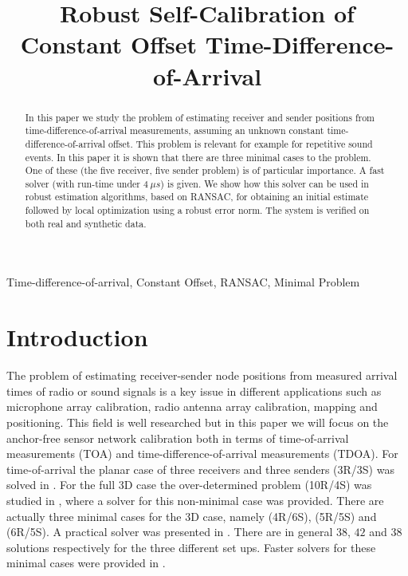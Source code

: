 \documentclass{article}
\title{Robust Self-Calibration of Constant Offset Time-Difference-of-Arrival}
\begin{document}
%
\maketitle
%
\begin{abstract}
In this paper we study the problem of estimating receiver and sender positions  from time-difference-of-arrival measurements, assuming an unknown constant time-difference-of-arrival offset. This problem is relevant for example for repetitive sound events. In this paper it is shown that there are three minimal cases to the problem. One of these (the five receiver, five sender problem) is of particular importance. A fast solver (with run-time under $4~ \mu s$) is given. We show how this solver can be used in robust estimation algorithms, based on RANSAC, for obtaining an initial estimate followed by local optimization using a robust error norm. The system is verified on both real and synthetic data. 
\end{abstract}
%
\begin{keywords}
Time-difference-of-arrival, Constant Offset, RANSAC, Minimal Problem
\end{keywords}
%
\vspace{-5pt}
\section{Introduction}
\label{sec:intro}
\vspace{-5pt}

The problem of estimating receiver-sender node positions from measured arrival times of radio or sound signals is a key issue in different applications such as microphone array calibration, radio antenna array calibration, mapping and positioning. This field is well researched but in this paper we will focus on the anchor-free sensor network calibration both in terms of time-of-arrival measurements (TOA) and time-difference-of-arrival measurements (TDOA). 
For time-of-arrival the planar case of three receivers and three senders (3R/3S) was solved in \cite{stewenius-phd-2005}.
For the full 3D case the over-determined problem (10R/4S) was studied in \cite{pollefeys-nister-icassp-08}, where a solver for this non-minimal case was provided.   
There are actually three minimal cases for the 3D case, namely (4R/6S), (5R/5S) and (6R/5S). A practical solver was presented in
\cite{kuang-burgess-etal-icassp-13}. There are in general $38$, $42$ and $38$ solutions respectively for the three different set ups. 
Faster solvers for these minimal cases were provided in \cite{larsson2017polynomial}.
\end{document}
